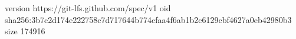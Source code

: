 version https://git-lfs.github.com/spec/v1
oid sha256:3b7c2d174e222758c7d717644b774cfaa4f6ab1b2c6129cbf4627a0eb42980b3
size 174916
